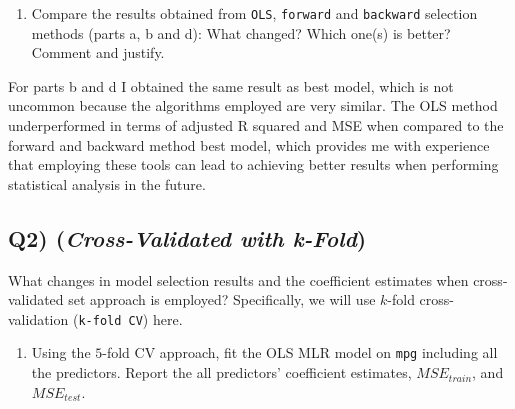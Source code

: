 \documentclass[
]{article}
\providecommand{\tightlist}{%
  \setlength{\itemsep}{0pt}\setlength{\parskip}{0pt}}
\begin{document}
\begin{enumerate}
\def\labelenumi{\alph{enumi}.}
\setcounter{enumi}{4}
\tightlist
\item
  Compare the results obtained from \texttt{OLS}, \texttt{forward} and
  \texttt{backward} selection methods (parts a, b and d): What changed?
  Which one(s) is better? Comment and justify.
\end{enumerate}

For parts b and d I obtained the same result as best model, which is not
uncommon because the algorithms employed are very similar. The OLS
method underperformed in terms of adjusted R squared and MSE when
compared to the forward and backward method best model, which provides
me with experience that employing these tools can lead to achieving
better results when performing statistical analysis in the future.

\hypertarget{q2-cross-validated-with-k-fold}{%
\subsection{\texorpdfstring{Q2) (\emph{Cross-Validated with
k-Fold})}{Q2) (Cross-Validated with k-Fold)}}\label{q2-cross-validated-with-k-fold}}

What changes in model selection results and the coefficient estimates
when cross-validated set approach is employed? Specifically, we will use
\(k\)-fold cross-validation (\texttt{k-fold\ CV}) here.

\begin{enumerate}
\def\labelenumi{\alph{enumi}.}
\tightlist
\item
  Using the \(5\)-fold CV approach, fit the OLS MLR model on
  \texttt{mpg} including all the predictors. Report the all predictors'
  coefficient estimates, \(MSE_{train}\), and \(MSE_{test}\).
\end{enumerate}
\end{document}

